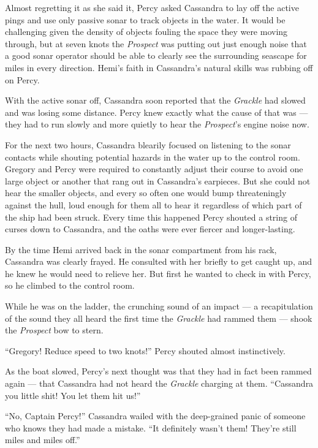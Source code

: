 \documentclass[
]{scrbook}
\begin{document}
Almost regretting it as she said it, Percy asked Cassandra to lay off
the active pings and use only passive sonar to track objects in the
water. It would be challenging given the density of objects fouling the
space they were moving through, but at seven knots the \emph{Prospect}
was putting out just enough noise that a good sonar operator should be
able to clearly see the surrounding seascape for miles in every
direction. Hemi's faith in Cassandra's natural skills was rubbing off on
Percy.

With the active sonar off, Cassandra soon reported that the
\emph{Grackle} had slowed and was losing some distance. Percy knew
exactly what the cause of that was --- they had to run slowly and more
quietly to hear the \emph{Prospect}'s engine noise now.

\bigskip

For the next two hours, Cassandra blearily focused on listening to the
sonar contacts while shouting potential hazards in the water up to the
control room. Gregory and Percy were required to constantly adjust their
course to avoid one large object or another that rang out in Cassandra's
earpieces. But she could not hear the smaller objects, and every so
often one would bump threateningly against the hull, loud enough for
them all to hear it regardless of which part of the ship had been
struck. Every time this happened Percy shouted a string of curses down
to Cassandra, and the oaths were ever fiercer and longer-lasting.

By the time Hemi arrived back in the sonar compartment from his rack,
Cassandra was clearly frayed. He consulted with her briefly to get
caught up, and he knew he would need to relieve her. But first he wanted
to check in with Percy, so he climbed to the control room.

While he was on the ladder, the crunching sound of an impact --- a
recapitulation of the sound they all heard the first time the
\emph{Grackle} had rammed them --- shook the \emph{Prospect} bow to
stern.

``Gregory! Reduce speed to two knots!'' Percy shouted almost
instinctively.

As the boat slowed, Percy's next thought was that they had in fact been
rammed again --- that Cassandra had not heard the \emph{Grackle}
charging at them. ``Cassandra you little shit! You let them hit us!''

``No, Captain Percy!'' Cassandra wailed with the deep-grained panic of
someone who knows they had made a mistake. ``It definitely wasn't them!
They're still miles and miles off.''
\end{document}
